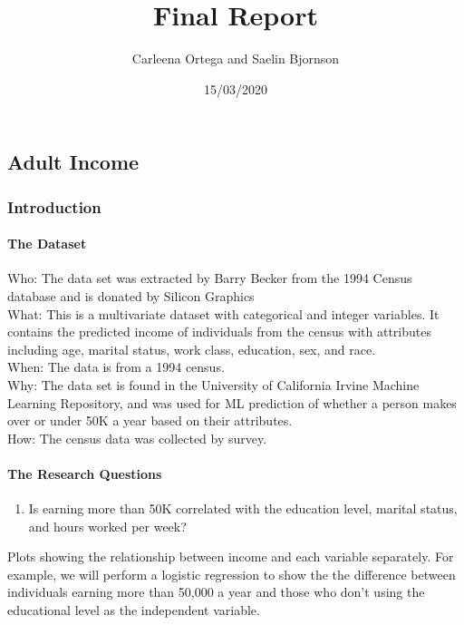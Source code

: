 \documentclass[]{article}
\title{Final Report}
\author{Carleena Ortega and Saelin Bjornson}
\date{15/03/2020}
\providecommand{\tightlist}{%
  \setlength{\itemsep}{0pt}\setlength{\parskip}{0pt}}
\let\oldparagraph\paragraph
\renewcommand{\paragraph}[1]{\oldparagraph{#1}\mbox{}}
\begin{document}
\maketitle

{
\setcounter{tocdepth}{4}
\tableofcontents
}
\hypertarget{adult-income}{%
\subsection{Adult Income}\label{adult-income}}

\hypertarget{introduction}{%
\subsubsection{Introduction}\label{introduction}}

\hypertarget{the-dataset}{%
\paragraph{The Dataset}\label{the-dataset}}

Who: The data set was extracted by Barry Becker from the 1994 Census
database and is donated by Silicon Graphics\\
What: This is a multivariate dataset with categorical and integer
variables. It contains the predicted income of individuals from the
census with attributes including age, marital status, work class,
education, sex, and race.\\
When: The data is from a 1994 census.\\
Why: The data set is found in the University of California Irvine
Machine Learning Repository, and was used for ML prediction of whether a
person makes over or under 50K a year based on their attributes.\\
How: The census data was collected by survey.

\hypertarget{the-research-questions}{%
\paragraph{The Research Questions}\label{the-research-questions}}

\begin{enumerate}
\def\labelenumi{\arabic{enumi}.}
\tightlist
\item
  Is earning more than 50K correlated with the education level, marital
  status, and hours worked per week?
\end{enumerate}

Plots showing the relationship between income and each variable
separately. For example, we will perform a logistic regression to show
the the difference between individuals earning more than 50,000 a year
and those who don't using the educational level as the independent
variable.
\end{document}

